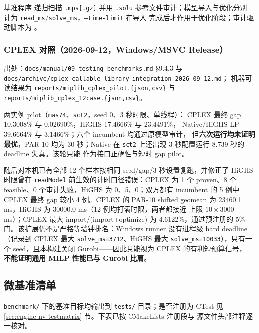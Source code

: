 基准程序  递归扫描
\texttt{.mps[.gz]} 并用 \texttt{.solu} 参考文件审计；模型导入与优化分别
计为 \texttt{read\_ms}/\texttt{solve\_ms}，\texttt{--time-limit} 在导入
完成后才作用于优化阶段；审计驱动脚本为
。

\subsubsection{CPLEX 对照（2026-09-12，Windows/MSVC Release）}

出处：\texttt{docs/manual/09-testing-benchmarks.md} §9.4.3 与
\texttt{docs/archive/cplex\_callable\_library\_integration\_2026-09-12.md}；
机器可读结果为 \texttt{reports/miplib\_cplex\_pilot.\{json,csv\}} 与
\texttt{reports/miplib\_cplex\_12case.\{json,csv\}}。

两实例 pilot（\texttt{mas74}、\texttt{sct2}，seed 0、3 秒时限、单线程）：
CPLEX 最终 gap 10.3008\% 与 0.02690\%，HiGHS 17.4666\% 与 23.4491\%，
Native/HiGHS-LP 39.6664\% 与 3.1466\%；六个 incumbent 均通过原模型审计，
但\textbf{六次运行均未证明最优}，PAR-10 均为 30 秒；Native 在
\texttt{sct2} 上还出现 3 秒配置运行 8.739 秒的 deadline 失真。该轮只能
作为接口正确性与短时 gap pilot。

随后对本机已有全部 12 个样本按相同 seed/gap/3 秒设置复跑，并修正了
HiGHS 时限曾在 \texttt{readModel} 前生效的计时口径错误：CPLEX 为 1 个
proven、8 个 feasible、0 个审计失败，HiGHS 为 0、5、0；双方都有
incumbent 的 5 例中 CPLEX 最终 gap 较小 4 例。CPLEX 的 PAR-10 shifted
geomean 为 23460.1 ms，HiGHS 为 30000.0 ms（12 例均打满时限，两者都接近
上限 $10\times3000$ ms）；CPLEX 最大 import/(import+optimize) 为
4.6122\%，通过预注册的 5\% 门。该扩展仍不是严格等墙钟排名：Windows
runner 没有进程级 hard deadline（记录到 CPLEX 最大
\texttt{solve\_ms=3712}、HiGHS 最大 \texttt{solve\_ms=10033}），只有一个
seed，且本构建关闭 Gurobi——因此只能视为 CPLEX 的有利短预算信号，
\textbf{不能证明通用 MILP 性能已与 Gurobi 比肩}。

\subsection{微基准清单}
\label{sec:engine-nv-microbench}

\texttt{benchmark/} 下的基准目标均输出到 \texttt{tests/} 目录；是否注册为
CTest 见 \ref{sec:engine-nv-testmatrix} 节。下表已按 CMakeLists 注册段与
源文件头部注释逐一核对。

